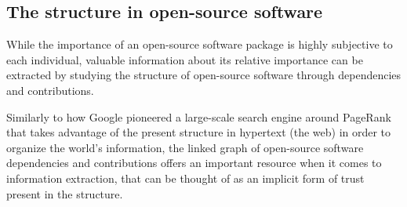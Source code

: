 
\subsection{The structure in open-source software}

While the importance of an open-source software package is highly subjective to
each individual, valuable information about its relative importance can be
extracted by studying the structure of open-source software through
dependencies and contributions.

Similarly to how Google pioneered a large-scale search engine around PageRank
that takes advantage of the present structure in hypertext (the web) in order
to organize the world’s information, the linked graph of open-source software
dependencies and contributions offers an important resource when it comes to information
extraction, that can be thought of as an implicit form of trust
present in the structure.

